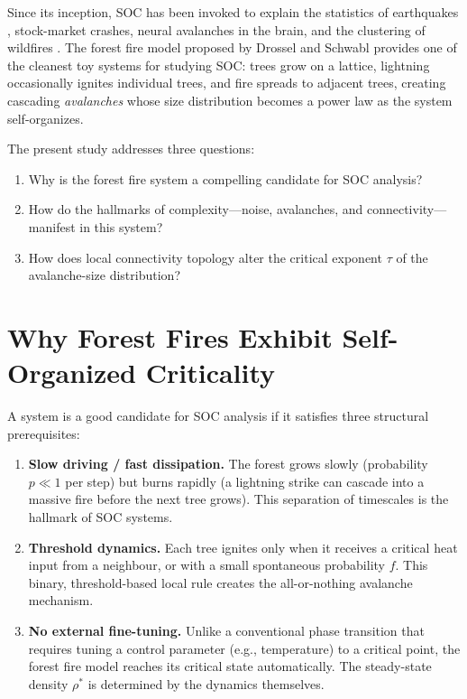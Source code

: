 \documentclass[12pt,a4paper]{article}
\begin{document}
Since its inception, SOC has been invoked to explain the statistics of
earthquakes \cite{olami1992}, stock-market crashes, neural avalanches in
the brain, and the clustering of wildfires \cite{malamud1998}. The forest
fire model proposed by Drossel and Schwabl \cite{drossel1992} provides one
of the cleanest toy systems for studying SOC: trees grow on a lattice,
lightning occasionally ignites individual trees, and fire spreads to
adjacent trees, creating cascading \emph{avalanches} whose size distribution
becomes a power law as the system self-organizes.

The present study addresses three questions:
\begin{enumerate}
  \item Why is the forest fire system a compelling candidate for SOC analysis?
  \item How do the hallmarks of complexity—noise, avalanches, and
        connectivity—manifest in this system?
  \item How does local connectivity topology alter the critical exponent
        $\tau$ of the avalanche-size distribution?
\end{enumerate}

\section{Why Forest Fires Exhibit Self-Organized Criticality}
\label{sec:why}

A system is a good candidate for SOC analysis if it satisfies three
structural prerequisites:

\begin{enumerate}
  \item \textbf{Slow driving / fast dissipation.} The forest grows slowly
        (probability $p \ll 1$ per step) but burns rapidly (a lightning
        strike can cascade into a massive fire before the next tree grows).
        This separation of timescales is the hallmark of SOC systems.

  \item \textbf{Threshold dynamics.} Each tree ignites only when it receives
        a critical heat input from a neighbour, or with a small spontaneous
        probability $f$. This binary, threshold-based local rule creates the
        all-or-nothing avalanche mechanism.

  \item \textbf{No external fine-tuning.} Unlike a conventional
        phase transition that requires tuning a control parameter (e.g.,
        temperature) to a critical point, the forest fire model reaches its
        critical state automatically. The steady-state density
        $\rho^*$ is determined by the dynamics themselves.
\end{enumerate}
\end{document}

